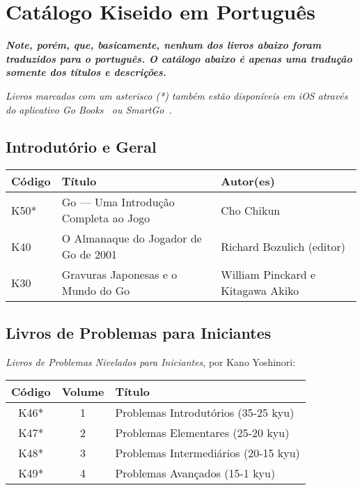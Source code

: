 \chapter{Catálogo Kiseido em Português}\label{ap:pt}

\textbf{\emph{Note, porém, que, basicamente, nenhum dos livros abaixo foram traduzidos para o português. O catálogo abaixo é apenas uma tradução somente dos títulos e descrições.}}

\bigskip

\emph{Livros marcados com um asterisco (*) também estão disponíveis em iOS através do aplicativo Go Books~\cite{gobooks} ou SmartGo~\cite{smartgo}.}

\section{Introdutório e Geral}

\begin{longtable}{l|p{45mm}|p{45mm}} 
    \hline
    \textbf{Código} & \textbf{Título} & \textbf{Autor(es)} \\
    \hline \hline
    K50* & Go --- Uma Introdução Completa ao Jogo & Cho Chikun \\
    \hline
    K40 & O Almanaque do Jogador de Go de 2001 & Richard Bozulich (editor) \\
    \hline
    K30 & Gravuras Japonesas e o Mundo do Go & William Pinckard e Kitagawa Akiko \\
    \hline
\end{longtable}


\section{Livros de Problemas para Iniciantes}

\emph{Livros de Problemas Nivelados para Iniciantes}, por Kano Yoshinori:

\pagebreak

\begin{longtable}{c|c|l} 
    \hline
    \textbf{Código} & \textbf{Volume} & \textbf{Título} \\
    \hline \hline
    K46* & 1 & Problemas Introdutórios (35-25 kyu) \\
    \hline
    K47* & 2 & Problemas Elementares (25-20 kyu) \\
    \hline
    K48* & 3 & Problemas Intermediários (20-15 kyu) \\
    \hline
    K49* & 4 & Problemas Avançados (15-1 kyu) \\
    \hline
\end{longtable}


